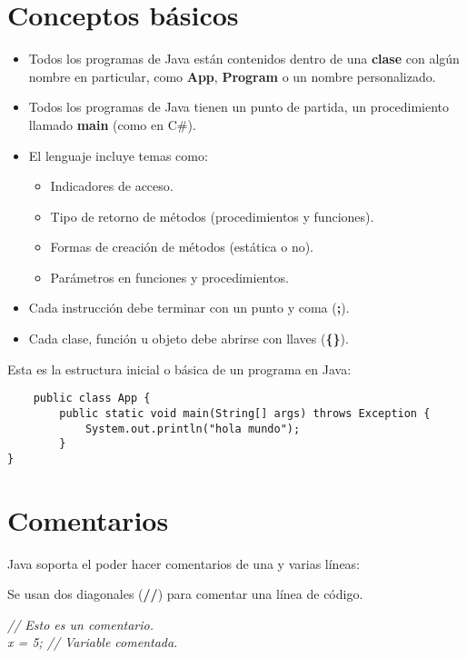 \section{Conceptos básicos}
\begin{itemize}
    \item Todos los programas de Java están contenidos dentro de una \textbf{clase} con algún nombre en particular, como \textbf{App}, \textbf{Program} o un nombre personalizado.
    \item Todos los programas de Java tienen un punto de partida, un procedimiento llamado \textbf{main} (como en C\#).
    \item El lenguaje incluye temas como:
    \begin{itemize}
        \item Indicadores de acceso.
        \item Tipo de retorno de métodos (procedimientos y funciones).
        \item Formas de creación de métodos (estática o no).
        \item Parámetros en funciones y procedimientos.
    \end{itemize}
    \item Cada instrucción debe terminar con un punto y coma (\textbf{;}).
    \item Cada clase, función u objeto debe abrirse con llaves (\textbf{\{\}}).
\end{itemize}
Esta es la estructura inicial o básica de un programa en Java:
\begin{lstlisting}
    public class App {
        public static void main(String[] args) throws Exception {
            System.out.println("hola mundo");
        }
}
\end{lstlisting}



\section{Comentarios}
\hspace{0.55cm}Java soporta el poder hacer comentarios de una y varias líneas:

Se usan dos diagonales (\textbf{//}) para comentar una línea de código.
\begin{center}
    \textit{
        // Esto es un comentario. \\
        x = 5; // Variable comentada.
    }
\end{center}

